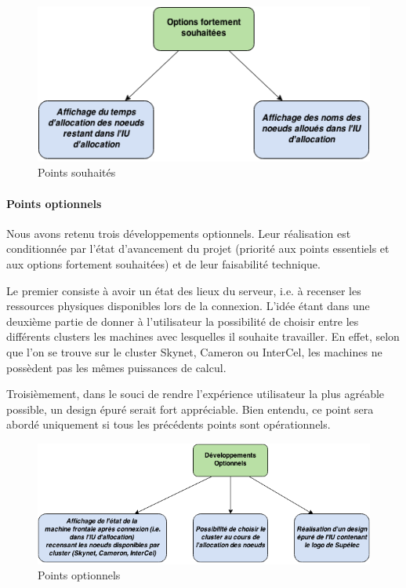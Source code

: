 \begin{figure}[h!]
  \centering
  \includegraphics[width=14cm]{images/points_souhaites.png}
  \caption{Points souhaités}
  \label{fig:pts_souhaites}
\end{figure}

\paragraph{Points optionnels}
\label{sec:points-optionnels}

\par Nous avons retenu trois développements optionnels. Leur réalisation est conditionnée par l’état d’avancement du projet (priorité aux points essentiels et aux options fortement souhaitées) et de leur faisabilité technique.
\par Le premier consiste à avoir un état des lieux du serveur, i.e. à recenser les ressources physiques disponibles lors de la connexion. L’idée étant dans une deuxième partie de donner à l’utilisateur la possibilité de choisir entre les différents clusters les machines avec lesquelles il souhaite travailler. En effet, selon que l’on se trouve sur le cluster Skynet, Cameron ou InterCel, les machines ne possèdent pas les mêmes puissances de calcul.
\par Troisièmement, dans le souci de rendre l’expérience utilisateur la plus agréable possible, un design épuré serait fort appréciable. Bien entendu, ce point sera abordé uniquement si tous les précédents points sont opérationnels.

\begin{figure}[h!]
  \centering
  \includegraphics[width=14cm]{images/points_optionnels.png}
  \caption{Points optionnels}
  \label{fig:pts_optionnels}
\end{figure}



